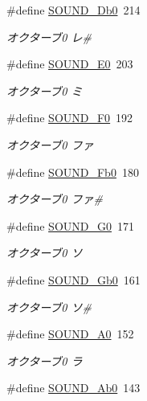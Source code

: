 \begin{DoxyCompactItemize}
\#define \hyperlink{sound_8h_ae54a9c279cc372bd69b65dd9d06f3210_ae54a9c279cc372bd69b65dd9d06f3210}{S\+O\+U\+N\+D\+\_\+\+Db0}~214
\begin{DoxyCompactList}\small\item\em オクターブ0 レ\# \end{DoxyCompactList}\item 
\#define \hyperlink{sound_8h_a19424f95bd658c3fb08a40b37fa18ae6_a19424f95bd658c3fb08a40b37fa18ae6}{S\+O\+U\+N\+D\+\_\+\+E0}~203
\begin{DoxyCompactList}\small\item\em オクターブ0 ミ \end{DoxyCompactList}\item 
\#define \hyperlink{sound_8h_a9c24cc4b865b592ab72a04852c7d194e_a9c24cc4b865b592ab72a04852c7d194e}{S\+O\+U\+N\+D\+\_\+\+F0}~192
\begin{DoxyCompactList}\small\item\em オクターブ0 ファ \end{DoxyCompactList}\item 
\#define \hyperlink{sound_8h_aaff9a7f05ba2237c933648fc79631254_aaff9a7f05ba2237c933648fc79631254}{S\+O\+U\+N\+D\+\_\+\+Fb0}~180
\begin{DoxyCompactList}\small\item\em オクターブ0 ファ\# \end{DoxyCompactList}\item 
\#define \hyperlink{sound_8h_a49cb5ffcf2e6a7e6a450e6bb6bb1fd55_a49cb5ffcf2e6a7e6a450e6bb6bb1fd55}{S\+O\+U\+N\+D\+\_\+\+G0}~171
\begin{DoxyCompactList}\small\item\em オクターブ0 ソ \end{DoxyCompactList}\item 
\#define \hyperlink{sound_8h_a7f5a3ed6713d6224d6e31d0020fdd430_a7f5a3ed6713d6224d6e31d0020fdd430}{S\+O\+U\+N\+D\+\_\+\+Gb0}~161
\begin{DoxyCompactList}\small\item\em オクターブ0 ソ\# \end{DoxyCompactList}\item 
\#define \hyperlink{sound_8h_abcc3b3196f02e1825a756586cff6adb5_abcc3b3196f02e1825a756586cff6adb5}{S\+O\+U\+N\+D\+\_\+\+A0}~152
\begin{DoxyCompactList}\small\item\em オクターブ0 ラ \end{DoxyCompactList}\item 
\#define \hyperlink{sound_8h_aa63270be4b563c05e755e9e9c62485d4_aa63270be4b563c05e755e9e9c62485d4}{S\+O\+U\+N\+D\+\_\+\+Ab0}~143

\end{DoxyCompactItemize}
